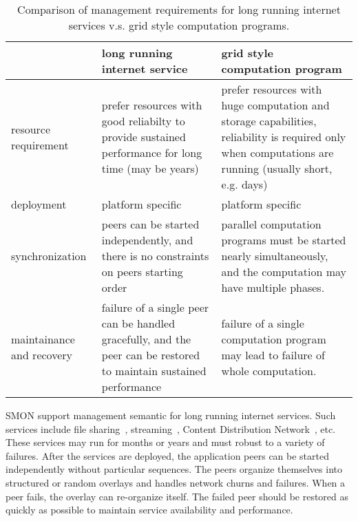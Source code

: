 \begin{table*}
\small
\centering
\begin{tabular}{|l|p{5cm}|p{5cm}|}

\hline

 & long running internet service & grid style computation
 program \\

\hline

resource requirement & prefer resources with good
reliabilty to provide sustained performance for long time
(may be years) & prefer
 resources with huge computation and storage capabilities,
 reliability is required only when computations are running
 (usually short, e.g. days) \\

\hline

deployment & platform specific & platform specific \\

\hline

synchronization & peers can be started independently, and there
is no constraints on peers starting order &
parallel computation programs must be started nearly
simultaneously, and the computation may have multiple
phases.\\

\hline

maintainance and recovery & failure of a single peer can be
handled gracefully, and the peer can be restored to maintain
sustained performance &
failure of a single computation program may lead to failure
of whole computation.\\

\hline

\end{tabular}
\caption{Comparison of management requirements for long
running internet services v.s. grid style computation
programs.}
\label{fig:app-man-req}
\end{table*}


SMON support management semantic for long running internet
services. Such services include file
sharing~\cite{bittorrent}, streaming~\cite{Kostic2003a},
Content Distribution Network~\cite{coral}, etc. These
services may run for months or years and must robust to a
variety of failures. After the services are deployed, the
application peers can be started independently without
particular sequences. The peers organize themselves into
structured or random overlays and handles network churns and
failures. When a peer fails, the overlay can re-organize
itself. The failed peer should be restored as quickly as
possible to maintain service availability and performance.

